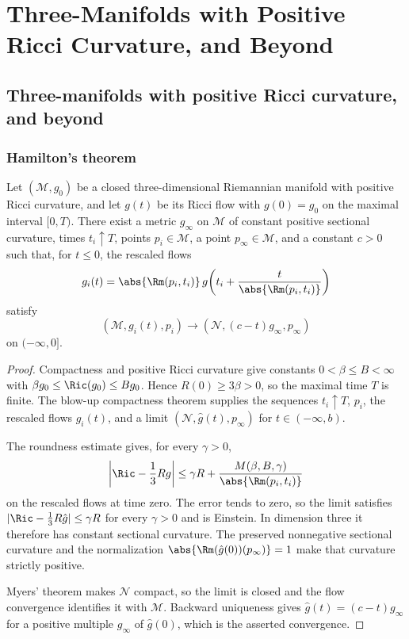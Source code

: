 \chapter{Three-Manifolds with Positive Ricci Curvature, and Beyond}

\section{Three-manifolds with positive Ricci curvature, and beyond}

\subsection{Hamilton's theorem}

\begin{theorem}
\label{topping-ch10-hamilton-theorem}

Let $(\mathcal{M},g_0)$ be a closed three-dimensional Riemannian manifold with
positive Ricci curvature, and let $g(t)$ be its Ricci flow with $g(0)=g_0$ on
the maximal interval $[0,T)$. There exist a metric $g_\infty$ on $\mathcal{M}$
of constant positive sectional curvature, times $t_i\uparrow T$, points
$p_i\in\mathcal{M}$, a point $p_\infty\in\mathcal{M}$, and a constant $c>0$
such that, for $t\leq 0$, the rescaled flows
\[
g_i(t)=\abs{\Rm(p_i,t_i)}\,g\!\left(t_i+
\frac{t}{\abs{\Rm(p_i,t_i)}}\right)
\]
satisfy
\[
(\mathcal{M},g_i(t),p_i)\longrightarrow
(\mathcal{N},(c-t)g_\infty,p_\infty)
\]
on $(-\infty,0]$.
\end{theorem}

\begin{proof}
\sketch Compactness and positive Ricci curvature give constants
$0<\beta\leq B<\infty$ with
$\beta g_0\leq\Ric(g_0)\leq Bg_0$. Hence $R(0)\geq3\beta>0$, so the
maximal time $T$ is finite. The blow-up compactness theorem supplies the
sequences $t_i\uparrow T$, $p_i$, the rescaled flows $g_i(t)$, and a limit
$(\mathcal{N},\hat g(t),p_\infty)$ for $t\in(-\infty,b)$.

The roundness estimate gives, for every $\gamma>0$,
\[
\left|\Ric-\frac13Rg\right|\leq\gamma R+
\frac{M(\beta,B,\gamma)}{\abs{\Rm(p_i,t_i)}}
\]
on the rescaled flows at time zero. The error tends to zero, so the limit
satisfies $|\Ric-\frac13R\hat g|\leq\gamma R$ for every $\gamma>0$ and is
Einstein. In dimension three it therefore has constant sectional curvature.
The preserved nonnegative sectional curvature and the normalization
$\abs{\Rm(\hat g(0))(p_\infty)}=1$ make that curvature strictly positive.

Myers' theorem makes $\mathcal{N}$ compact, so the limit is closed and the
flow convergence identifies it with $\mathcal{M}$. Backward uniqueness gives
$\hat g(t)=(c-t)g_\infty$ for a positive multiple $g_\infty$ of $\hat g(0)$,
which is the asserted convergence.
\end{proof}

